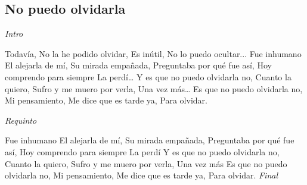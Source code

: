 \subsection{No puedo olvidarla}
\noindent

\vspace{1cm}

\begin{guitar}
	\begin{multicols}{2}
		\textit{Intro}

		Todavía,
	No la he podido olvidar,
	Es inútil,
	No lo puedo ocultar...
	Fue inhumano
	El alejarla de mí,
	Su mirada empañada,
	Preguntaba por qué fue así,
	Hoy comprendo para siempre
	La perdí\dots
	Y es que no puedo olvidarla no,
	Cuanto la quiero,
	Sufro y me muero por verla,
	Una vez más\dots
	Es que no puedo olvidarla no,
	Mi pensamiento,
	Me dice que es tarde ya,
	Para olvidar.

	\par
	\textit{Requinto}
	\par

	Fue inhumano
	El alejarla de mí,
	Su mirada empañada,
	Preguntaba por qué fue así,
	Hoy comprendo para siempre
	La perdí
	Y es que no puedo olvidarla no,
	Cuanto la quiero,
	Sufro y me muero por verla,
	Una vez más
	Es que no puedo olvidarla no,
	Mi pensamiento,
	Me dice que es tarde ya,
	Para olvidar.
		\textit{Final}
	\end{multicols}
\end{guitar}
